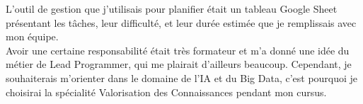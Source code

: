 L'outil de gestion que j'utilisais pour planifier était un tableau Google Sheet présentant les tâches, leur difficulté, et leur durée estimée que je remplissais avec mon équipe.\\

Avoir une certaine responsabilité était très formateur et m'a donné une idée du métier de Lead Programmer, qui me plairait d'ailleurs beaucoup.
Cependant, je souhaiterais m'orienter dans le domaine de l'IA et du Big Data, c'est pourquoi je choisirai la spécialité Valorisation des Connaissances pendant mon cursus.